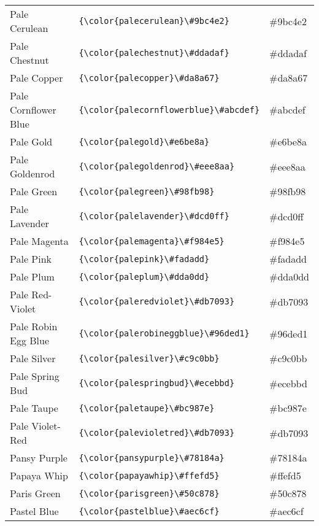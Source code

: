 \documentclass[9.5pt]{article}
\begin{document}
\begin{longtable}{l | l | l}
	Pale Cerulean & \verb!{\color{palecerulean}\#9bc4e2}! & {\color{palecerulean}\#9bc4e2}\\
	Pale Chestnut & \verb!{\color{palechestnut}\#ddadaf}! & {\color{palechestnut}\#ddadaf}\\
	Pale Copper & \verb!{\color{palecopper}\#da8a67}! & {\color{palecopper}\#da8a67}\\
	Pale Cornflower Blue & \verb!{\color{palecornflowerblue}\#abcdef}! & {\color{palecornflowerblue}\#abcdef}\\
	Pale Gold & \verb!{\color{palegold}\#e6be8a}! & {\color{palegold}\#e6be8a}\\
	Pale Goldenrod & \verb!{\color{palegoldenrod}\#eee8aa}! & {\color{palegoldenrod}\#eee8aa}\\
	Pale Green & \verb!{\color{palegreen}\#98fb98}! & {\color{palegreen}\#98fb98}\\
	Pale Lavender & \verb!{\color{palelavender}\#dcd0ff}! & {\color{palelavender}\#dcd0ff}\\
	Pale Magenta & \verb!{\color{palemagenta}\#f984e5}! & {\color{palemagenta}\#f984e5}\\
	Pale Pink & \verb!{\color{palepink}\#fadadd}! & {\color{palepink}\#fadadd}\\
	Pale Plum & \verb!{\color{paleplum}\#dda0dd}! & {\color{paleplum}\#dda0dd}\\
	Pale Red-Violet & \verb!{\color{paleredviolet}\#db7093}! & {\color{paleredviolet}\#db7093}\\
	Pale Robin Egg Blue & \verb!{\color{palerobineggblue}\#96ded1}! & {\color{palerobineggblue}\#96ded1}\\
	Pale Silver & \verb!{\color{palesilver}\#c9c0bb}! & {\color{palesilver}\#c9c0bb}\\
	Pale Spring Bud & \verb!{\color{palespringbud}\#ecebbd}! & {\color{palespringbud}\#ecebbd}\\
	Pale Taupe & \verb!{\color{paletaupe}\#bc987e}! & {\color{paletaupe}\#bc987e}\\
	Pale Violet-Red & \verb!{\color{palevioletred}\#db7093}! & {\color{palevioletred}\#db7093}\\
	Pansy Purple & \verb!{\color{pansypurple}\#78184a}! & {\color{pansypurple}\#78184a}\\
	Papaya Whip & \verb!{\color{papayawhip}\#ffefd5}! & {\color{papayawhip}\#ffefd5}\\
	Paris Green & \verb!{\color{parisgreen}\#50c878}! & {\color{parisgreen}\#50c878}\\
	Pastel Blue & \verb!{\color{pastelblue}\#aec6cf}! & {\color{pastelblue}\#aec6cf}\\

\end{longtable}
\end{document}
